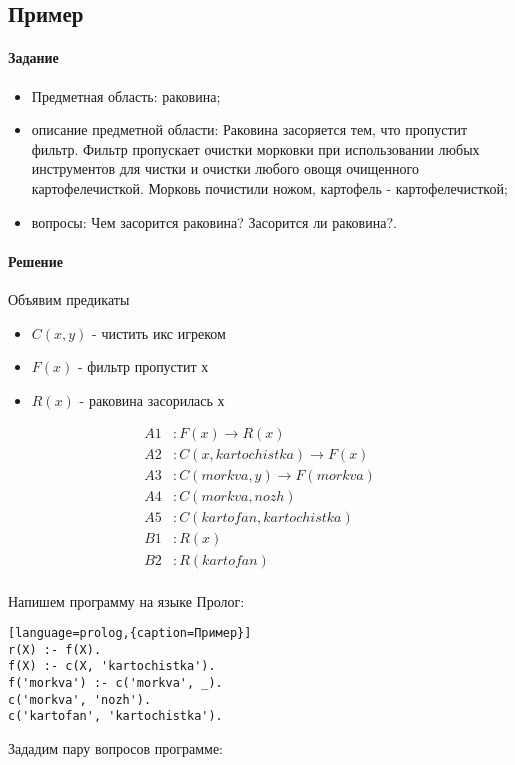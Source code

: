 \documentclass[a4paper,12pt]{article}
\begin{document}
\subsection{Пример}
\paragraph{Задание}
\begin{itemize}
	\item Предметная область: раковина;
	\item описание предметной области: Раковина засоряется тем, что пропустит фильтр. Фильтр пропускает очистки морковки при использовании любых инструментов для чистки и очистки любого овощя очищенного картофелечисткой. Морковь почистили ножом, картофель - картофелечисткой;
	\item вопросы: Чем засорится раковина? Засорится ли раковина?.
\end{itemize}

\paragraph{Решение} Объявим предикаты
\begin{itemize}
	\item $C(x,y)$ - чистить икс игреком
	\item $F(x)$ - фильтр пропустит х
	\item $R(x)$ - раковина засорилась х
\end{itemize}

\begin{align*}
A1&: F(x) \to R(x)\\
A2&: C(x, kartochistka) \to F(x)\\
A3&: C(morkva, y) \to F(morkva)\\
A4&: C(morkva, nozh)\\
A5&: C(kartofan, kartochistka)\\
B1&: R(x)\\
B2&: R(kartofan)\\
\end{align*}

Напишем программу на языке Пролог:

\begin{lstlisting}[language=prolog,{caption=Пример}]
r(X) :- f(X).
f(X) :- c(X, 'kartochistka').
f('morkva') :- c('morkva', _).
c('morkva', 'nozh').
c('kartofan', 'kartochistka').
\end{lstlisting}

Зададим пару вопросов программе:
\end{document}
